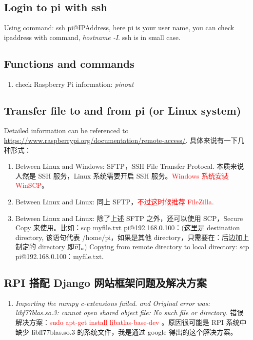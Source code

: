 \documentclass[UTF8,fancyhdr,a4paper]{ctexart}
\begin{document}
\subsection{Login to pi with ssh}
Using command: ssh pi@IPAddress, here pi is your user name, you can check ipaddress with command, \textit{hostname -I}. ssh is in small case.
\subsection{Functions and commands}
\begin{enumerate}
\item check Raspberry Pi information: \textit{pinout}
\end{enumerate}
\subsection{Transfer file to and from pi (or Linux system)}
Detailed information can be referenced to \url{https://www.raspberrypi.org/documentation/remote-access/}. 具体来说有一下几种形式：
\begin{enumerate}
\item Between Linux and Windows: SFTP，SSH File Transfer Protocal. 本质来说人然是 SSH 服务，Linux 系统需要开启 SSH 服务。\textcolor{red}{Windows 系统安装 WinSCP}。
\item Between Linux and Linux: 同上 SFTP，\textcolor{red}{不过这时候推荐 FileZilla}.
\item Between Linux and Linux: 除了上述 SFTP 之外，还可以使用 SCP，Secure Copy 来使用。比如：scp myfile.txt pi@192.168.0.100：(这里是 destination directory, 该语句代表 /home/pi，如果是其他 directory，只需要在：后边加上制定的 directory 即可。) Copying from remote directory to local directory: scp pi@192.168.0.100：myfile.txt. 
\end{enumerate}

\subsection{RPI 搭配 Django 网站框架问题及解决方案}
\begin{enumerate}
\item \emph{Importing the numpy c-extensions failed. and Original error was: libf77blas.so.3: cannot open shared object file: No such file or directory.} 错误解决方案：\textcolor{red}{sudo apt-get install libatlas-base-dev} 。原因很可能是 RPI 系统中缺少 libff77blas.so.3 的系统文件，我是通过 google 得出的这个解决方案。
\end{enumerate}
\end{document}
